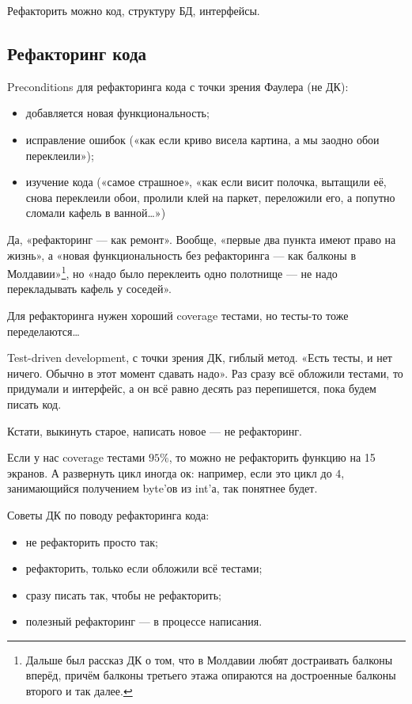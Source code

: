 \documentclass[11pt,a4paper]{article}
\begin{document}
Рефакторить можно код, структуру БД, интерфейсы.

\subsection{Рефакторинг кода}
Preconditions для рефакторинга кода с точки зрения Фаулера (не ДК):
\begin{itemize}
\item добавляется новая функциональность;
\item исправление ошибок («как если криво висела картина, а мы заодно обои переклеили»);
\item изучение кода («самое страшное», «как если висит полочка, вытащили её, снова переклеили обои, пролили клей на паркет, переложили его, а попутно сломали кафель в ванной…»)
\end{itemize}

Да, «рефакторинг — как ремонт». Вообще, «первые два пункта имеют право на жизнь», а «новая функциональность без рефакторинга — как балконы в Молдавии»\footnote{Дальше был рассказ ДК о том, что в Молдавии любят достраивать балконы вперёд, причём балконы третьего этажа опираются на достроенные балконы второго и так далее.}, но «надо было переклеить одно полотнище — не надо перекладывать кафель у соседей».

Для рефакторинга нужен хороший coverage тестами, но тесты-то тоже переделаются…

Test-driven development, с точки зрения ДК, гиблый метод. «Есть тесты, и нет ничего. Обычно в этот момент сдавать надо». Раз сразу всё обложили тестами, то придумали и интерфейс, а он всё равно десять раз перепишется, пока будем писать код.

Кстати, выкинуть старое, написать новое — не рефакторинг.

Если у нас coverage тестами $95\%$, то можно не рефакторить функцию на 15 экранов. А развернуть цикл иногда ок: например, если это цикл до $4$, занимающийся получением byte'ов из int'а, так понятнее будет.

Советы ДК по поводу рефакторинга кода:
\begin{itemize}
\item не рефакторить просто так;
\item рефакторить, только если обложили всё тестами;
\item сразу писать так, чтобы не рефакторить;
\item полезный рефакторинг — в процессе написания.
\end{itemize}
\end{document}
